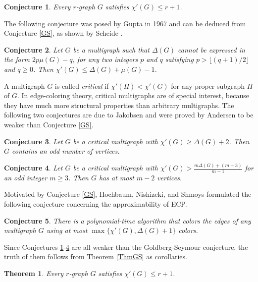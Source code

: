 \documentclass[11pt]{article}
\newtheorem{theorem}{Theorem}[section]
\newtheorem{conjecture}{Conjecture}[section]
\begin{document}
\begin{conjecture} \label{Sey} 
Every $r$-graph $G$ satisfies $\chi'(G)\le r+1$. 
\end{conjecture}

The following conjecture was posed by Gupta \cite{G} in 1967 and can be deduced from Conjecture \ref{GS}, as 
shown by Scheide \cite{S07}. 

\begin{conjecture} \label{Gupta67} 
Let $G$ be a multigraph such that $\Delta(G)$ cannot be expressed in the form $2p\mu(G)-q$,
for any two integers $p$ and $q$ satisfying $p > \lfloor (q+1)/2 \rfloor$ and $q \ge 0$. Then 
$\chi'(G)\le \Delta(G)+\mu(G)-1$. 
\end{conjecture}

A multigraph $G$ is called {\em critical}\label{critical} if $\chi'(H)<\chi'(G)$ for any proper subgraph $H$ of $G$. 
In edge-coloring theory, critical multigraphs are of special interest, because they have much more 
structural properties than arbitrary multigraphs. The following two conjectures are due to Jakobsen \cite{J0,J} 
and were proved by Andersen \cite{An77} to be weaker than Conjecture \ref{GS}. 

\begin{conjecture} \label{And0} 
Let $G$ be a critical multigraph with $\chi'(G) \ge \Delta(G)+2$. Then $G$ contains an odd number of
vertices.
\end{conjecture}

\begin{conjecture} \label{And} 
Let $G$ be a critical multigraph with $\chi'(G)>\frac{m \Delta(G)+(m-3)}{m-1}$ for an odd 
integer $m \ge 3$. Then $G$ has at most $m-2$ vertices.
\end{conjecture}

Motivated by Conjecture \ref{GS}, Hochbaum, Nishizeki, and Shmoys \cite{HNS86} formulated the following 
conjecture concerning the approximability of ECP.

\begin{conjecture} \label{HNS} 
There is a polynomial-time algorithm that colors the edges of any multigraph $G$ using at most $\max\{\chi'(G), \Delta(G)+1\}$ colors. 
\end{conjecture}

Since Conjectures \ref{Sey}-\ref{And} are all weaker than the Goldberg-Seymour conjecture, the truth of them follows 
from Theorem \ref{ThmGS} as corollaries.

\begin{theorem} \label{ThmSey} 
Every $r$-graph $G$ satisfies $\chi'(G)\le r+1$. 
\end{theorem}
\end{document}
